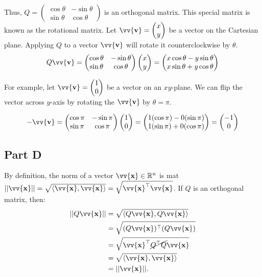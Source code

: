 \documentclass[12pt]{article}
\newcommand{\vect}[1]{\vv{\mathbf{#1}}}
\newcommand{\R}{\mathbb{R}}
\begin{document}
Thus, $Q = \begin{pmatrix}
    \cos\theta & -\sin\theta \\
    \sin\theta & \cos\theta
\end{pmatrix}$ is an orthogonal matrix. This special matrix is known as the rotational matrix. Let $\vect{v}=\begin{pmatrix}
    x \\ y
\end{pmatrix}$ be a vector on the Cartesian plane. Applying $Q$ to a vector $\vect{v}$ will rotate it counterclockwise by $\theta$.
$$
Q\vect{v} = \begin{pmatrix}
    \cos\theta & -\sin\theta \\
    \sin\theta & \cos\theta
\end{pmatrix}
\begin{pmatrix}
    x \\ y
\end{pmatrix}
= \begin{pmatrix}
    x\cos\theta - y\sin\theta \\
    x\sin\theta + y\cos\theta
\end{pmatrix}
$$

For example, let $\vect{v}=\begin{pmatrix}
    1 \\ 0
\end{pmatrix}$ be a vector on an $xy$-plane. We can flip the vector across $y$-axis by rotating the $\vect{v}$ by $\theta=\pi$.

$$
-\vect{v}
= \begin{pmatrix}
    \cos\pi & -\sin\pi \\
    \sin\pi & \cos\pi
\end{pmatrix}
\begin{pmatrix}
    1 \\ 0
\end{pmatrix}
= \begin{pmatrix}
    1(\cos\pi) - 0(\sin\pi) \\
    1(\sin\pi) + 0(\cos\pi)
\end{pmatrix}
= \begin{pmatrix}
    -1 \\ 0
\end{pmatrix}
$$

\subsection*{Part D}

By definition, the norm of a vector $\vect{x}\in\R^n$ is mat $||\vect{x}|| = \sqrt{\langle\vect{x},\vect{x}\rangle} = \sqrt{\vect{x}^\top \vect{x}}$. If $Q$ is an orthogonal matrix, then:
\begin{align*}
    ||Q\vect{x}|| &= \sqrt{\langle Q\vect{x}, Q\vect{x}\rangle} \\
    &= \sqrt{(Q\vect{x})^\top (Q\vect{x})} \\
    &= \sqrt{\vect{x}^\top \cancel{Q^\top Q}\vect{x}} \\
    &= \sqrt{\langle\vect{x},\vect{x}\rangle} \\
    &= ||\vect{x}||.
\end{align*}
\end{document}
